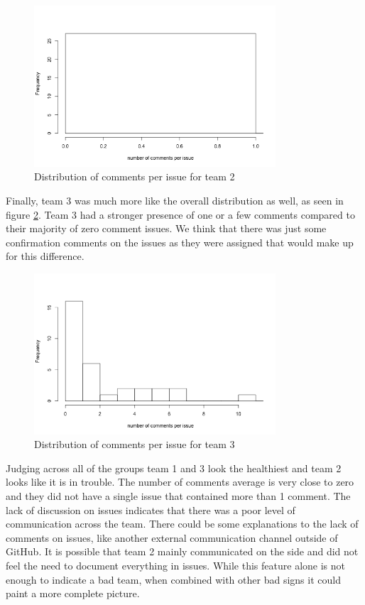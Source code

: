 \documentclass[conference]{IEEEtran}
\begin{document}
\begin{figure}[H]
    \centering
    \includegraphics[width=9cm]{../AprilProject/pic/distribution/comment_per_issue_distribution_team2.png}
    \caption{Distribution of comments per issue for team 2}
    \label{comments_issue_team2}
\end{figure}

Finally, team 3 was much more like the overall distribution as well, as seen in figure \ref{comments_issue_team3}. Team 3 had a stronger presence of one or a few comments compared to their majority of zero comment issues. We think that there was just some confirmation comments on the issues as they were assigned that would make up for this difference. 

\begin{figure}[H]
    \centering
    \includegraphics[width=9cm]{../AprilProject/pic/distribution/comment_per_issue_distribution_team3.png}
    \caption{Distribution of comments per issue for team 3}
    \label{comments_issue_team3}
\end{figure}

Judging across all of the groups team 1 and 3 look the healthiest and team 2 looks like it is in trouble. The number of comments average is very close to zero and they did not have a single issue that contained more than 1 comment. The lack of discussion on issues indicates that there was a poor level of communication across the team. There could be some explanations to the lack of comments on issues, like another external communication channel outside of GitHub. It is possible that team 2 mainly communicated on the side and did not feel the need to document everything in issues. While this feature alone is not enough to indicate a bad team, when combined with other bad signs it could paint a more complete picture. 
\end{document}
